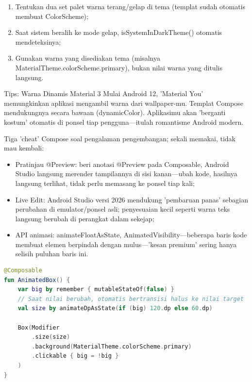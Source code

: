 \begin{enumerate}
  \item Tentukan dua set palet warna terang/gelap di tema (templat sudah otomatis membuat ColorScheme);
  \item Saat sistem beralih ke mode gelap, isSystemInDarkTheme() otomatis mendeteksinya;
  \item Gunakan warna yang disediakan tema (misalnya MaterialTheme.colorScheme.primary), bukan nilai warna yang ditulis langsung.
\end{enumerate}

\begin{tcbinfo}{Tips: Warna Dinamis Material 3}
Mulai Android 12, 'Material You' memungkinkan aplikasi mengambil warna dari wallpaper-mu. Templat Compose mendukungnya secara bawaan (dynamicColor). Aplikasimu akan 'berganti kostum' otomatis di ponsel tiap pengguna—itulah romantisme Android modern.

\end{tcbinfo}


Tiga 'cheat' Compose soal pengalaman pengembangan; sekali memakai, tidak mau kembali:

\begin{itemize}
  \item Pratinjau @Preview: beri anotasi @Preview pada Composable, Android Studio langsung merender tampilannya di sisi kanan—ubah kode, hasilnya langsung terlihat, tidak perlu memasang ke ponsel tiap kali;
  \item Live Edit: Android Studio versi 2026 mendukung 'pembaruan panas' sebagian perubahan di emulator/ponsel asli; penyesuaian kecil seperti warna teks langsung berubah di perangkat dalam sekejap;
  \item API animasi: animateFloatAsState, AnimatedVisibility—beberapa baris kode membuat elemen berpindah dengan mulus—'kesan premium' sering hanya selisih puluhan baris ini.
\end{itemize}

\begin{lstlisting}[language=Kotlin]
@Composable
fun AnimatedBox() {
    var big by remember { mutableStateOf(false) }
    // Saat nilai berubah, otomatis bertransisi halus ke nilai target
    val size by animateDpAsState(if (big) 120.dp else 60.dp)

    Box(Modifier
        .size(size)
        .background(MaterialTheme.colorScheme.primary)
        .clickable { big = !big }
    )
}
\end{lstlisting}

